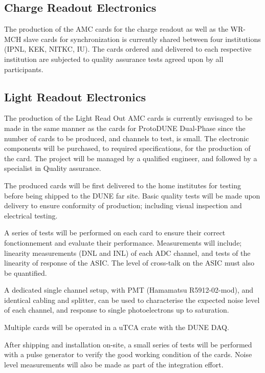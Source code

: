 \subsection{Charge Readout Electronics}
\label{sec:fddp-tpc-elec-prod-cro}
The production of the AMC cards for the charge readout as well as the WR-MCH slave cards for synchronization is currently shared between four institutions (IPNL, KEK, NITKC, IU). The cards ordered and delivered to each respective institution are subjected to quality assurance tests agreed upon by all participants.  

\subsection{Light Readout Electronics}
\label{sec:fddp-tpc-elec-prod-lro}

The production of the Light Read Out AMC cards is currently envisaged to be made in the same manner as the cards for ProtoDUNE Dual-Phase since the number of cards to be produced, and channels to test, is small. The electronic components will be purchased, to required specifications, for the production of the card. The project will be managed by a qualified engineer, and followed by a specialist in Quality assurance.

The produced cards will be first delivered to the home institutes for testing before being shipped to the DUNE far site.  Basic quality tests will be made upon delivery to ensure conformity of production; including visual inspection and electrical testing.

A series of tests will be performed on each card to ensure their correct fonctionnement and evaluate their performance. Measurements will include; linearity measurements (DNL and INL) of each ADC channel, and tests of the linearity of response of the ASIC. The level of cross-talk on the ASIC must also be quantified.

A dedicated single channel setup, with PMT (Hamamatsu R5912-02-mod), and identical cabling and splitter, can be used to characterise the expected noise level of each channel, and response to single photoelectrons up to saturation. 

Multiple cards will be operated in a uTCA crate with the DUNE DAQ.

After shipping and installation on-site, a small series of tests will be performed with a pulse generator to verify the good working condition of the cards. Noise level measurements will also be made as part of the integration effort.

